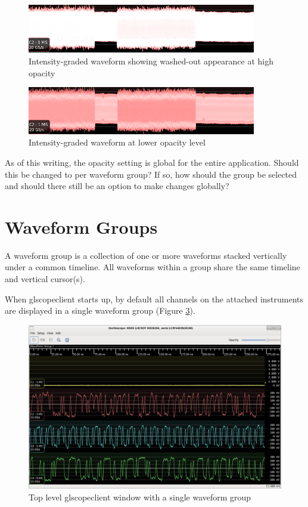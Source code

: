 \documentclass[11pt]{article}
\begin{document}
\begin{figure}[H]
\centering
\includegraphics[width=10cm]{images/washedout-waveform.png}
\caption{Intensity-graded waveform showing washed-out appearance at high opacity}
\label{washedout-waveform}
\end{figure}

\begin{figure}[H]
\centering
\includegraphics[width=10cm]{images/graded-waveform.png}
\caption{Intensity-graded waveform at lower opacity level}
\label{graded-waveform}
\end{figure}

As of this writing, the opacity setting is global for the entire application. Should this be changed to per waveform
group? If so, how should the group be selected and should there still be an option to make changes globally?

\FloatBarrier
\pagebreak
\section{Waveform Groups}

A waveform group is a collection of one or more waveforms stacked vertically under a common timeline. All waveforms
within a group share the same timeline and vertical cursor(s).

When glscopeclient starts up, by default all channels on the attached instruments are displayed in a single waveform
group (Figure \ref{single-group}).

\begin{figure}[h]
\centering
\includegraphics[width=13cm]{images/overview.png}
\caption{Top level glscopeclient window with a single waveform group}
\label{single-group}
\end{figure}
\end{document}
